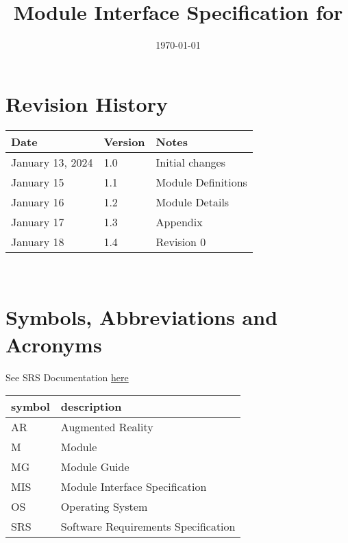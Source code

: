 \documentclass[12pt, titlepage]{article}
\begin{document}
\title{Module Interface Specification for \progname{}}

\author{\authname}

\date{\today}

\maketitle


\section{Revision History}

\begin{tabularx}{\textwidth}{p{3cm}p{2cm}X}
\toprule {\bf Date} & {\bf Version} & {\bf Notes}\\
\midrule
January 13, 2024 & 1.0 & Initial changes\\
January 15 & 1.1 & Module Definitions\\
January 16 & 1.2 & Module Details\\
January 17 & 1.3 & Appendix\\
January 18 & 1.4 & Revision 0\\
\bottomrule
\end{tabularx}

~\newpage

\section{Symbols, Abbreviations and Acronyms}

See SRS Documentation \href{https://github.com/SammyG7/Mac-AR/blob/main/docs/SRS/SRS.pdf} {here}\\


\renewcommand{\arraystretch}{1.2}
\begin{tabular}{l l} 
  \toprule		
  \textbf{symbol} & \textbf{description}\\
  \midrule 
  AR & Augmented Reality\\
  M & Module \\
  MG & Module Guide \\
  MIS & Module Interface Specification\\
  OS & Operating System \\
  SRS & Software Requirements Specification\\
  \bottomrule
\end{tabular}\\
\end{document}
